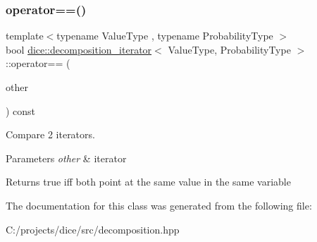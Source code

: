 \subsubsection{\texorpdfstring{operator==()}{operator==()}}
{\footnotesize\ttfamily template$<$typename Value\+Type , typename Probability\+Type $>$ \\
bool \mbox{\hyperlink{classdice_1_1decomposition__iterator}{dice\+::decomposition\+\_\+iterator}}$<$ Value\+Type, Probability\+Type $>$\+::operator== (\begin{DoxyParamCaption}\item[{const \mbox{\hyperlink{classdice_1_1decomposition__iterator}{decomposition\+\_\+iterator}}$<$ Value\+Type, Probability\+Type $>$ \&}]{other }\end{DoxyParamCaption}) const\hspace{0.3cm}{\ttfamily [inline]}}



Compare 2 iterators. 


\begin{DoxyParams}{Parameters}
{\em other} & iterator\\
\hline
\end{DoxyParams}
\begin{DoxyReturn}{Returns}
true iff both point at the same value in the same variable 
\end{DoxyReturn}


The documentation for this class was generated from the following file\+:\begin{DoxyCompactItemize}
\item 
C\+:/projects/dice/src/decomposition.\+hpp\end{DoxyCompactItemize}
